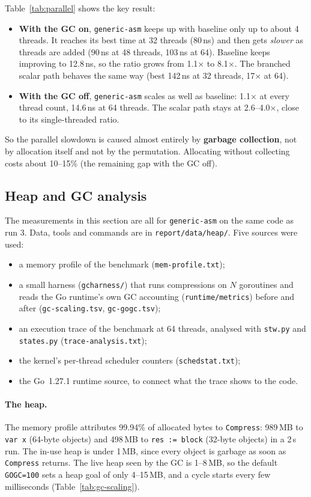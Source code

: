 \documentclass[10pt,a4paper]{article}
\begin{document}
Table~\ref{tab:parallel} shows the key result:
\begin{itemize}
  \item \textbf{With the GC on}, \texttt{generic-asm} keeps up with baseline only up to
    about 4 threads. It reaches its best time at 32 threads (80\,ns) and then gets
    \emph{slower} as threads are added (90\,ns at 48 threads, 103\,ns at 64). Baseline keeps
    improving to 12.8\,ns, so the ratio grows from 1.1$\times$ to 8.1$\times$. The branched
    scalar path behaves the same way (best 142\,ns at 32 threads, 17$\times$ at 64).
  \item \textbf{With the GC off}, \texttt{generic-asm} scales as well as baseline:
    1.1$\times$ at every thread count, 14.6\,ns at 64 threads. The scalar path stays at
    2.6--4.0$\times$, close to its single-threaded ratio.
\end{itemize}
So the parallel slowdown is caused almost entirely by \textbf{garbage collection}, not by
allocation itself and not by the permutation. Allocating without collecting costs
about 10--15\% (the remaining gap with the GC off).

\subsection{Heap and GC analysis}\label{sec:heap}

The measurements in this section are all for \texttt{generic-asm} on the same code as run 3.
Data, tools and commands are in \texttt{report/data/heap/}. Five sources were used:
\begin{itemize}
  \item a memory profile of the benchmark (\texttt{mem-profile.txt});
  \item a small harness (\texttt{gcharness/}) that runs compressions on $N$ goroutines
    and reads the Go runtime's own GC accounting (\texttt{runtime/metrics}) before and after
    (\texttt{gc-scaling.tsv}, \texttt{gc-gogc.tsv});
  \item an execution trace of the benchmark at 64 threads, analysed with
    \texttt{stw.py} and \texttt{states.py} (\texttt{trace-analysis.txt});
  \item the kernel's per-thread scheduler counters (\texttt{schedstat.txt});
  \item the Go~1.27.1 runtime source, to connect what the trace shows to the code.
\end{itemize}

\paragraph{The heap.} The memory profile attributes 99.94\% of allocated bytes to
\texttt{Compress}: 989\,MB to \texttt{var x} (64-byte objects) and 498\,MB to
\texttt{res := block} (32-byte objects) in a 2\,s run. The in-use heap is under 1\,MB,
since every object is garbage as soon as \texttt{Compress} returns. The live heap seen by
the GC is 1--8\,MB, so the default \texttt{GOGC=100} sets a heap goal of only 4--15\,MB, and
a cycle starts every few milliseconds (Table~\ref{tab:gc-scaling}).
\end{document}
